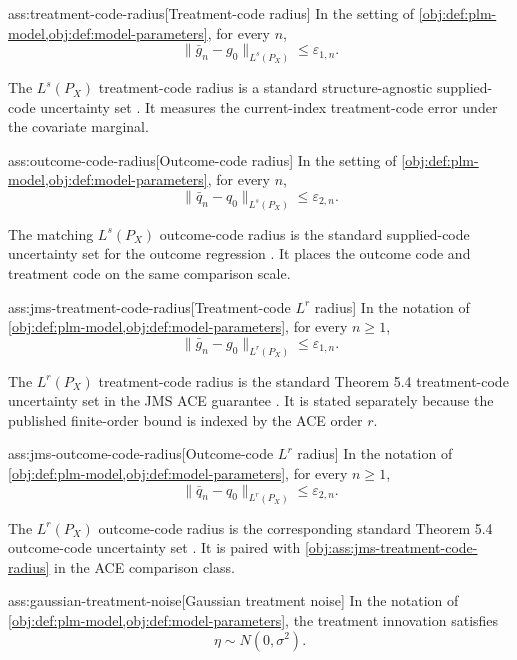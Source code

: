 \documentclass[11pt]{article}
\begin{document}
\begin{assumptionv}{ass:treatment-code-radius}[Treatment-code radius]
In the setting of \cref{obj:def:plm-model,obj:def:model-parameters}, for every \(n\),
\[
\lVert \bar g_n-g_0\rVert_{L^s(P_X)}\le\varepsilon_{1,n}.
\]
\end{assumptionv}

The \(L^s(P_X)\) treatment-code radius is a standard structure-agnostic supplied-code uncertainty set \citep{JinMackeySyrgkanis2025}. It measures the current-index treatment-code error under the covariate marginal.

\begin{assumptionv}{ass:outcome-code-radius}[Outcome-code radius]
In the setting of \cref{obj:def:plm-model,obj:def:model-parameters}, for every \(n\),
\[
\lVert \bar q_n-q_0\rVert_{L^s(P_X)}\le\varepsilon_{2,n}.
\]
\end{assumptionv}

The matching \(L^s(P_X)\) outcome-code radius is the standard supplied-code uncertainty set for the outcome regression \citep{JinMackeySyrgkanis2025}. It places the outcome code and treatment code on the same comparison scale.

\begin{assumptionv}{ass:jms-treatment-code-radius}[Treatment-code \(L^r\) radius]
In the notation of \cref{obj:def:plm-model,obj:def:model-parameters}, for every \(n\ge 1\),
\[
\|\bar g_n-g_0\|_{L^r(P_X)}\le \varepsilon_{1,n}.
\]
\end{assumptionv}

The \(L^r(P_X)\) treatment-code radius is the standard Theorem 5.4 treatment-code uncertainty set in the JMS ACE guarantee \citep{JinMackeySyrgkanis2025}. It is stated separately because the published finite-order bound is indexed by the ACE order \(r\).

\begin{assumptionv}{ass:jms-outcome-code-radius}[Outcome-code \(L^r\) radius]
In the notation of \cref{obj:def:plm-model,obj:def:model-parameters}, for every \(n\ge 1\),
\[
\|\bar q_n-q_0\|_{L^r(P_X)}\le \varepsilon_{2,n}.
\]
\end{assumptionv}

The \(L^r(P_X)\) outcome-code radius is the corresponding standard Theorem 5.4 outcome-code uncertainty set \citep{JinMackeySyrgkanis2025}. It is paired with \cref{obj:ass:jms-treatment-code-radius} in the ACE comparison class.

\begin{assumptionv}{ass:gaussian-treatment-noise}[Gaussian treatment noise]
In the notation of \cref{obj:def:plm-model,obj:def:model-parameters}, the treatment innovation satisfies
\[
\eta\sim N(0,\sigma^2).
\]
\end{assumptionv}
\end{document}
